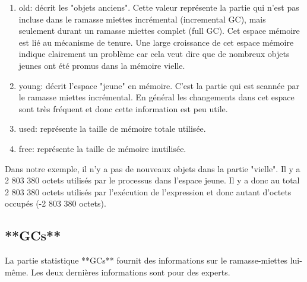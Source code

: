 \documentclass[a4paper,10pt,twoside]{book}
\begin{document}
\begin{enumerate}
\item old: d\'ecrit les "objets anciens". Cette valeur repr\'esente la
  partie qui n'est pas incluse dans le ramasse miettes incr\'emental
  (incremental GC),  mais seulement durant un ramasse miettes complet
  (full GC). Cet espace m\'emoire est li\'e au m\'ecanisme de tenure. Une large croissance de cet espace m\'emoire indique
  clairement un probl\`eme car cela veut dire que de nombreux objets  jeunes ont \'et\'e promus dans la m\'emoire vielle.

\item young: d\'ecrit l'espace "jeune" en m\'emoire. C'est la partie
  qui est scann\'ee par le  ramasse miettes incr\'emental. En
  g\'en\'eral les changements dans cet espace sont tr\`es fr\'equent
  et donc cette information est peu utile.

\item used: repr\'esente la taille de m\'emoire totale  utilis\'ee.

\item free: repr\'esente la taille de m\'emoire inutilis\'ee.
\end{enumerate}

Dans notre exemple, il n'y a pas de nouveaux objets dans la partie "vielle". Il y a
2 803 380 octets utilis\'es par le processus dans l'espace jeune. Il y a
donc au total 2 803 380 octets utilis\'es par l'ex\'ecution de
l'expression et donc autant d'octets occup\'es (-2 803 380 octets).

\subsection{**GCs**}

La partie statistique **GCs** fournit des informations sur le
ramasse-miettes lui-m\^eme. Les deux derni\`eres informations sont
pour des experts. 
\end{document}
